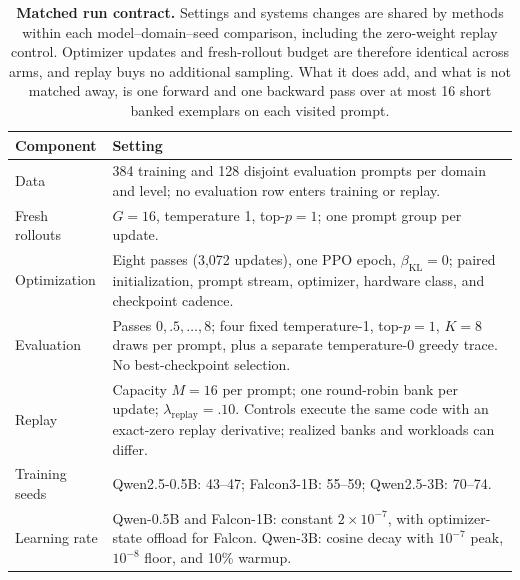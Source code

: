 \documentclass{article}
\newcommand{\1}{\mathbf 1}
\theoremstyle{remark}
\theoremstyle{definition}
\theoremstyle{plain}
\begin{document}
\begin{table}[!htbp]
  \centering
  \caption{\textbf{Matched run contract.} Settings and systems changes are
  shared by methods within each model--domain--seed comparison, including
  the zero-weight replay control. Optimizer updates and fresh-rollout budget
  are therefore identical across arms, and replay buys no additional sampling.
  What it does add, and what is not matched away, is one forward and one
  backward pass over at most 16 short banked exemplars on each visited prompt.}
  \label{tab:run-contract}
  \small
  \begin{tabularx}{\linewidth}{@{}P{.23\linewidth}Y@{}}
    \toprule
    \textbf{Component} & \textbf{Setting} \\
    \midrule
    Data & 384 training and 128 disjoint evaluation prompts per domain and
      level; no evaluation row enters training or replay. \\
    Fresh rollouts & $G=16$, temperature 1, top-$p=1$; one prompt group per update. \\
    Optimization & Eight passes (3,072 updates), one PPO epoch,
      $\beta_{\mathrm{KL}}=0$; paired initialization, prompt stream,
      optimizer, hardware class, and checkpoint cadence. \\
    Evaluation & Passes $0,.5,\ldots,8$; four fixed temperature-1,
      top-$p=1$, $K=8$ draws per prompt, plus a separate temperature-0
      greedy trace. No best-checkpoint selection. \\
    Replay & Capacity $M=16$ per prompt; one round-robin bank per update;
      $\lambda_{\mathrm{replay}}=.10$. Controls execute the same code with
      an exact-zero replay derivative; realized banks and workloads can differ. \\
    Training seeds & Qwen2.5-0.5B: 43--47; Falcon3-1B: 55--59;
      Qwen2.5-3B: 70--74. \\
    Learning rate & Qwen-0.5B and Falcon-1B: constant $2\times10^{-7}$,
      with optimizer-state offload for Falcon. Qwen-3B: cosine decay with
      $10^{-7}$ peak, $10^{-8}$ floor, and 10\% warmup. \\

\end{tabularx}
\end{table}
\end{document}
